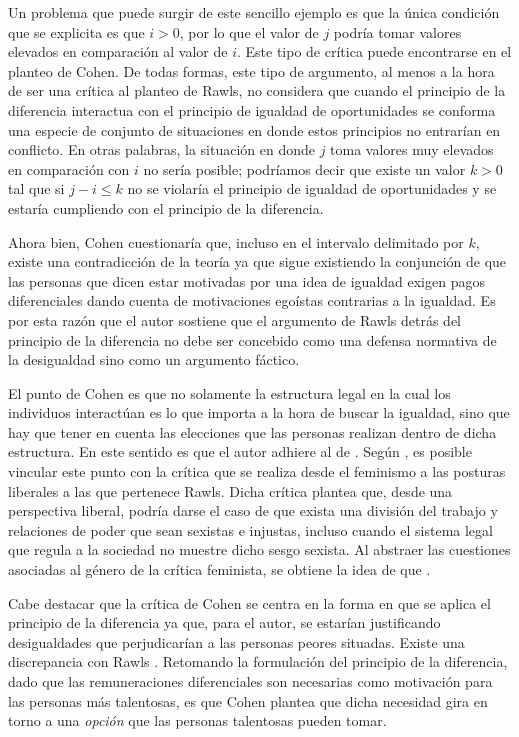 Un problema que puede surgir de este sencillo ejemplo es que la única condición que se explicita es que $i >0$, por lo que el valor de $j$ podría tomar valores elevados en comparación al valor de $i$. Este tipo de crítica puede encontrarse en el planteo de Cohen. De todas formas, este tipo de argumento, al menos a la hora de ser una crítica al planteo de Rawls, no considera que cuando el principio de la diferencia interactua con el principio de igualdad de oportunidades se conforma una especie de conjunto de situaciones en donde estos principios no entrarían en conflicto. En otras palabras, la situación en donde $j$ toma valores muy elevados en comparación con $i$ no sería posible; podríamos decir que existe un valor $k > 0$ tal que si $j - i \leq k$ no se violaría el principio de igualdad de oportunidades y se estaría cumpliendo con el principio de la diferencia.

Ahora bien, Cohen cuestionaría que, incluso en el intervalo delimitado por $k$, existe una contradicción de la teoría ya que sigue existiendo la conjunción de que las personas que dicen estar motivadas por una idea de igualdad exigen pagos diferenciales dando cuenta de motivaciones egoístas contrarias a la igualdad. Es por esta razón que el autor sostiene que el argumento de Rawls detrás del principio de la diferencia no debe ser concebido como una defensa normativa de la desigualdad sino como un argumento fáctico.



El punto de Cohen es que no solamente la estructura legal en la cual los individuos interactúan es lo que importa a la hora de buscar la igualdad, sino que hay que tener en cuenta las elecciones que las personas realizan dentro de dicha estructura. En este sentido es que el autor adhiere al  de . Según \citet{Cohen_2001}, es posible vincular este punto con la crítica que se realiza desde el feminismo a las posturas liberales a las que pertenece Rawls. Dicha crítica plantea que, desde una perspectiva liberal, podría darse el caso de que exista una división del trabajo y relaciones de poder que sean sexistas e injustas, incluso cuando el sistema legal que regula a la sociedad no muestre dicho sesgo sexista. Al abstraer las cuestiones asociadas al género de la crítica feminista, se obtiene la idea de que  \citep[p. 167]{Cohen_2001}.

Cabe destacar que la crítica de Cohen se centra en la forma en que se aplica el principio de la diferencia ya que, para el autor, se estarían justificando desigualdades que perjudicarían a las personas peores situadas. Existe una discrepancia con Rawls  \citep[p. 169]{Cohen_2001}. Retomando la formulación del principio de la diferencia, dado que las remuneraciones diferenciales son necesarias como motivación para las personas más talentosas, es que Cohen plantea que dicha necesidad gira en torno a una \textit{opción} que las personas talentosas pueden tomar. 


